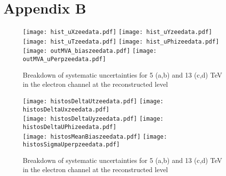\chapter{Appendix B}
    
    
\begin{figure}[h]
	\centering
	{\texttt{[image: hist\_uXzeedata.pdf]}}
	{\texttt{[image: hist\_uYzeedata.pdf]}} \\
	{\texttt{[image: hist\_uTzeedata.pdf]}}
	{\texttt{[image: hist\_uPhizeedata.pdf]}}\\
	{\texttt{[image: outMVA\_biaszeedata.pdf]}}
	{\texttt{[image: outMVA\_uPerpzeedata.pdf]}}
	\caption{ Breakdown of systematic uncertainties for 5 (a,b) and 13 (c,d) TeV in the electron channel at the reconstructed level}
	\label{fig:reco_sys_bkd_elec}
\end{figure}
\begin{figure}[h]
	\centering
	{\texttt{[image: histosDeltaUtzeedata.pdf]}}
	{\texttt{[image: histosDeltaUxzeedata.pdf]}} \\
	{\texttt{[image: histosDeltaUyzeedata.pdf]}}
	{\texttt{[image: histosDeltaUPhizeedata.pdf]}}\\
	{\texttt{[image: histosMeanBiaszeedata.pdf]}}
	{\texttt{[image: histosSigmaUperpzeedata.pdf]}}
	\caption{ Breakdown of systematic uncertainties for 5 (a,b) and 13 (c,d) TeV in the electron channel at the reconstructed level}
	\label{fig:reco_sys_bkd_elec}
\end{figure}
%
%
